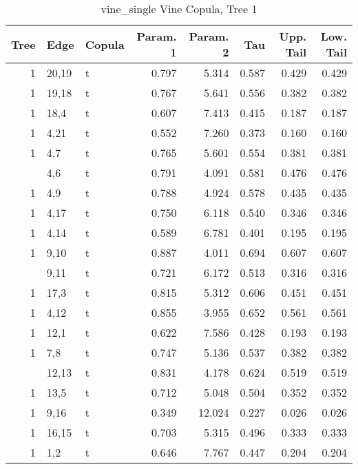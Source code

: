 \begin{table}

\caption{vine_single Vine Copula, Tree 1}
\centering
\begin{tabular}[t]{rllrrrrr}
\toprule
Tree & Edge & Copula & Param. 1 & Param. 2 & Tau & Upp. Tail & Low. Tail\\
\midrule
1 & 20,19 & t & 0.797 & 5.314 & 0.587 & 0.429 & 0.429\\
1 & 19,18 & t & 0.767 & 5.641 & 0.556 & 0.382 & 0.382\\
1 & 18,4 & t & 0.607 & 7.413 & 0.415 & 0.187 & 0.187\\
1 & 4,21 & t & 0.552 & 7.260 & 0.373 & 0.160 & 0.160\\
1 & 4,7 & t & 0.765 & 5.601 & 0.554 & 0.381 & 0.381\\
\addlinespace
1 & 4,6 & t & 0.791 & 4.091 & 0.581 & 0.476 & 0.476\\
1 & 4,9 & t & 0.788 & 4.924 & 0.578 & 0.435 & 0.435\\
1 & 4,17 & t & 0.750 & 6.118 & 0.540 & 0.346 & 0.346\\
1 & 4,14 & t & 0.589 & 6.781 & 0.401 & 0.195 & 0.195\\
1 & 9,10 & t & 0.887 & 4.011 & 0.694 & 0.607 & 0.607\\
\addlinespace
1 & 9,11 & t & 0.721 & 6.172 & 0.513 & 0.316 & 0.316\\
1 & 17,3 & t & 0.815 & 5.312 & 0.606 & 0.451 & 0.451\\
1 & 4,12 & t & 0.855 & 3.955 & 0.652 & 0.561 & 0.561\\
1 & 12,1 & t & 0.622 & 7.586 & 0.428 & 0.193 & 0.193\\
1 & 7,8 & t & 0.747 & 5.136 & 0.537 & 0.382 & 0.382\\
\addlinespace
1 & 12,13 & t & 0.831 & 4.178 & 0.624 & 0.519 & 0.519\\
1 & 13,5 & t & 0.712 & 5.048 & 0.504 & 0.352 & 0.352\\
1 & 9,16 & t & 0.349 & 12.024 & 0.227 & 0.026 & 0.026\\
1 & 16,15 & t & 0.703 & 5.315 & 0.496 & 0.333 & 0.333\\
1 & 1,2 & t & 0.646 & 7.767 & 0.447 & 0.204 & 0.204\\
\bottomrule
\end{tabular}
\end{table}
